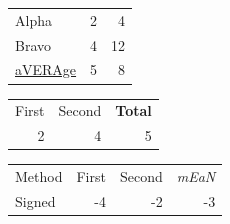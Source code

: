 \begin{tabular}{lrr}
Alpha & 2 & 4 \\
Bravo & 4 & 12 \\
\underline{aVERAge} & 5 & 8 \\
\end{tabular}
\begin{tabular}{rrr}
First & Second & \textbf{Total} \\
2 & 4 & \cellcolor{blue}5 \\
\end{tabular}
\begin{tabular}{lrrr}
Method & First & Second & \emph{mEaN} \\
Signed & -4 & -2 & -3 \\
\end{tabular}
\nocite{*}
